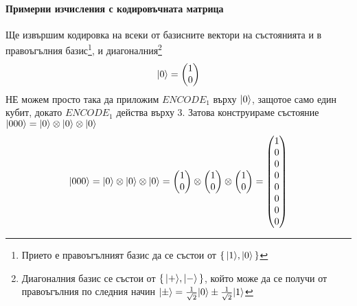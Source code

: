 \documentclass[11pt,oneside,a4paper]{article}
\begin{document}
\paragraph{Примерни изчисления с кодировъчната матрица}
Ще извършим кодировка на всеки от базисните вектори на състоянията и в правоъгълния базис\footnote{
Прието е правоъгълният базис да се състои от $\set{{\left\vert{1}\right\rangle}, {\left\vert{0}\right\rangle}}$
}, и диагоналния\footnote{
Диагоналния базис се състои от $\set{{\left\vert{+}\right\rangle}, {\left\vert{-}\right\rangle}}$, който може да се получи от правоъгълния по следния начин ${\left\vert{\pm}\right\rangle} = \frac{1}{\sqrt{2}}{\left\vert{0}\right\rangle} \pm \frac{1}{\sqrt{2}}{\left\vert{1}\right\rangle}$
}
\begin{equation}
    {\left\vert{0}\right\rangle} = \begin{pmatrix}1\\0\end{pmatrix}
\end{equation}
НЕ можем просто така да приложим $ENCODE_1$ върху ${\left\vert{0}\right\rangle}$, защотое само един кубит, докато $ENCODE_1$ действа върху 3. Затова конструираме състояние ${\left\vert{000}\right\rangle} = {\left\vert{0}\right\rangle} \otimes {\left\vert{0}\right\rangle} \otimes {\left\vert{0}\right\rangle}$
\begin{equation}
    {\left\vert{000}\right\rangle} = {\left\vert{0}\right\rangle} \otimes {\left\vert{0}\right\rangle} \otimes {\left\vert{0}\right\rangle} = \begin{pmatrix}1\\0\end{pmatrix} \otimes \begin{pmatrix}1\\0\end{pmatrix} \otimes \begin{pmatrix}1\\0\end{pmatrix} = 
    \begin{pmatrix}1\\0\\0\\0\\0\\0\\0\\0\end{pmatrix}
\end{equation}
\end{document}

